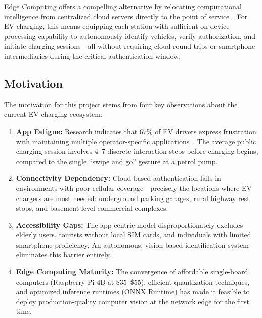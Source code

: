 \documentclass[11pt]{report}
\begin{document}
Edge Computing offers a compelling alternative by relocating computational intelligence from centralized cloud servers directly to the point of service~\cite{shi2016}. For EV charging, this means equipping each station with sufficient on-device processing capability to autonomously identify vehicles, verify authorization, and initiate charging sessions---all without requiring cloud round-trips or smartphone intermediaries during the critical authentication window.

\subsection{Motivation}

The motivation for this project stems from four key observations about the current EV charging ecosystem:

\begin{enumerate}
    \item \textbf{App Fatigue:} Research indicates that 67\% of EV drivers express frustration with maintaining multiple operator-specific applications~\cite{hardman2018}. The average public charging session involves 4--7 discrete interaction steps before charging begins, compared to the single ``swipe and go'' gesture at a petrol pump.
    
    \item \textbf{Connectivity Dependency:} Cloud-based authentication fails in environments with poor cellular coverage---precisely the locations where EV chargers are most needed: underground parking garages, rural highway rest stops, and basement-level commercial complexes.
    
    \item \textbf{Accessibility Gaps:} The app-centric model disproportionately excludes elderly users, tourists without local SIM cards, and individuals with limited smartphone proficiency. An autonomous, vision-based identification system eliminates this barrier entirely.
    
    \item \textbf{Edge Computing Maturity:} The convergence of affordable single-board computers (Raspberry Pi 4B at \$35--\$55), efficient quantization techniques, and optimized inference runtimes (ONNX Runtime) has made it feasible to deploy production-quality computer vision at the network edge for the first time.
\end{enumerate}
\end{document}
